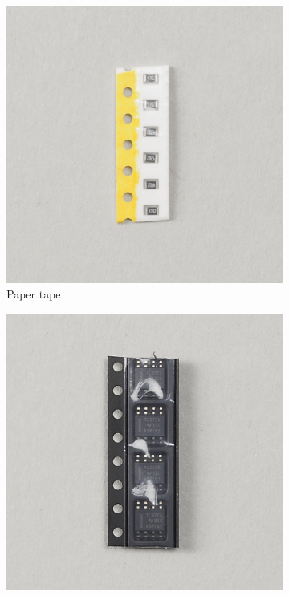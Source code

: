 \documentclass[12pt, a4paper]{article}
\begin{document}
\begin{figure}[H]
    \centering
    \begin{subfigure}{0.3\textwidth}
        \includegraphics[width=\textwidth]{images/01_01_paper_tape.jpg}
        \caption*{Paper tape}
    \end{subfigure}
    \hspace{2mm}
    \begin{subfigure}{0.3\textwidth}
        \includegraphics[width=\textwidth]{images/01_02_plastic_tape.jpg}

\end{subfigure}
\end{figure}
\end{document}
